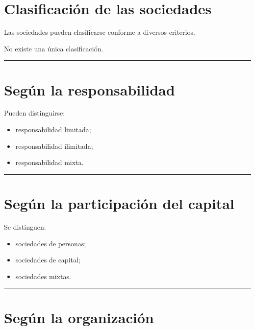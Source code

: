 \documentclass[
  spanish,
  letterpaper,
  DIV=11,
  numbers=noendperiod]{scrartcl}
\providecommand{\tightlist}{%
  \setlength{\itemsep}{0pt}\setlength{\parskip}{0pt}}
\begin{document}
\section{Clasificación de las
sociedades}\label{clasificaciuxf3n-de-las-sociedades}

Las sociedades pueden clasificarse conforme a diversos criterios.

No existe una única clasificación.

\begin{center}\rule{0.5\linewidth}{0.5pt}\end{center}

\section{Según la responsabilidad}\label{seguxfan-la-responsabilidad}

Pueden distinguirse:

\begin{itemize}
\tightlist
\item
  responsabilidad limitada;
\item
  responsabilidad ilimitada;
\item
  responsabilidad mixta.
\end{itemize}

\begin{center}\rule{0.5\linewidth}{0.5pt}\end{center}

\section{Según la participación del
capital}\label{seguxfan-la-participaciuxf3n-del-capital}

Se distinguen:

\begin{itemize}
\tightlist
\item
  sociedades de personas;
\item
  sociedades de capital;
\item
  sociedades mixtas.
\end{itemize}

\begin{center}\rule{0.5\linewidth}{0.5pt}\end{center}

\section{Según la organización}\label{seguxfan-la-organizaciuxf3n}
\end{document}
